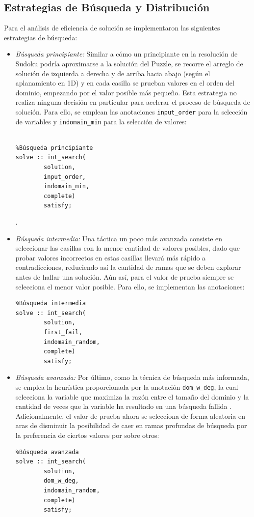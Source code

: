 \subsection{Estrategias de Búsqueda y Distribución}
Para el análisis de eficiencia de solución se implementaron las siguientes estrategias de búsqueda:
\begin{itemize}
    \item \textit{Búsqueda principiante:} Similar a cómo un principiante en la resolución de Sudoku podría aproximarse a la solución del Puzzle, se recorre el arreglo de solución de izquierda a derecha y de arriba hacia abajo (según el aplanamiento en 1D) y en cada casilla se prueban valores en el orden del dominio, empezando por el valor posible más pequeño. Esta estrategia no realiza ninguna decisión en particular para acelerar el proceso de búsqueda de solución. Para ello, se emplean las anotaciones \verb|input_order| para la selección de variables y \verb|indomain_min| para la selección de valores:
    \begin{verbatim}
    
%Búsqueda principiante
solve :: int_search(
        solution,         
        input_order, 
        indomain_min, 
        complete) 
        satisfy;
    \end{verbatim}.

    \item \textit{Búsqueda intermedia:} Una táctica un poco más avanzada consiste en seleccionar las casillas con la menor cantidad de valores posibles, dado que probar valores incorrectos en estas casillas llevará más rápido a contradicciones, reduciendo así la cantidad de ramas que se deben explorar antes de hallar una solución. Aún así, para el valor de prueba siempre se selecciona el menor valor posible. Para ello, se implementan las anotaciones:
    \begin{verbatim}
%Búsqueda intermedia
solve :: int_search(
        solution,         
        first_fail, 
        indomain_random, 
        complete) 
        satisfy;
    \end{verbatim}

    \item \textit{Búsqueda avanzada:} Por último, como la técnica de búsqueda más informada, se emplea la heurística proporcionada por la anotación \verb|dom_w_deg|, la cual selecciona la variable que maximiza la razón entre el tamaño del dominio y la cantidad de veces que la variable ha resultado en una búsqueda fallida \cite{Stuckey2020}. Adicionalmente, el valor de prueba ahora se selecciona de forma aleatoria en aras de disminuir la posibilidad de caer en ramas profundas de búsqueda por la preferencia de ciertos valores por sobre otros:
    \begin{verbatim}
%Búsqueda avanzada
solve :: int_search(
        solution,         
        dom_w_deg, 
        indomain_random, 
        complete) 
        satisfy;
    \end{verbatim}
\end{itemize}

